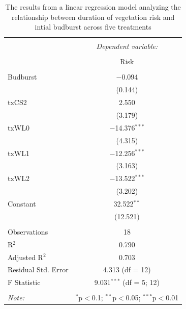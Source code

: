 \documentclass{article}\usepackage[]{graphicx}\usepackage[]{color}
\makeatletter
\newenvironment{kframe}{%
 \def\at@end@of@kframe{}%
 \ifinner\ifhmode%
  \def\at@end@of@kframe{\end{minipage}}%
  \begin{minipage}{\columnwidth}%
 \fi\fi%
 \def\FrameCommand##1{\hskip\@totalleftmargin \hskip-\fboxsep
 \colorbox{shadecolor}{##1}\hskip-\fboxsep
     \hskip-\linewidth \hskip-\@totalleftmargin \hskip\columnwidth}%
 \MakeFramed {\advance\hsize-\width
   \@totalleftmargin\z@ \linewidth\hsize
   \@setminipage}}%
 {\par\unskip\endMakeFramed%
 \at@end@of@kframe}
\makeatother
\begin{document}
\begin{kframe}


{\ttfamily\noindent{}}

{\ttfamily\noindent\bfseries{}}\end{kframe}
\begin{table}[!htbp] \centering 
  \caption{The results from a linear regression model analyzing the relationship between duration of vegetation risk and intial budburst across five treatments} 
  \label{} 
\begin{tabular}{@{\extracolsep{5pt}}lc} 
\\[-1.8ex]\hline 
\hline \\[-1.8ex] 
 & \multicolumn{1}{c}{\textit{Dependent variable:}} \\ 
\cline{2-2} 
\\[-1.8ex] & Risk \\ 
\hline \\[-1.8ex] 
 Budburst & $-$0.094 \\ 
  & (0.144) \\ 
  txCS2 & 2.550 \\ 
  & (3.179) \\ 
  txWL0 & $-$14.376$^{***}$ \\ 
  & (4.315) \\ 
  txWL1 & $-$12.256$^{***}$ \\ 
  & (3.163) \\ 
  txWL2 & $-$13.522$^{***}$ \\ 
  & (3.202) \\ 
  Constant & 32.522$^{**}$ \\ 
  & (12.521) \\ 
 \hline \\[-1.8ex] 
Observations & 18 \\ 
R$^{2}$ & 0.790 \\ 
Adjusted R$^{2}$ & 0.703 \\ 
Residual Std. Error & 4.313 (df = 12) \\ 
F Statistic & 9.031$^{***}$ (df = 5; 12) \\ 
\hline 
\hline \\[-1.8ex] 
\textit{Note:}  & \multicolumn{1}{r}{$^{*}$p$<$0.1; $^{**}$p$<$0.05; $^{***}$p$<$0.01} \\ 
\end{tabular} 
\end{table} 
\end{document}
